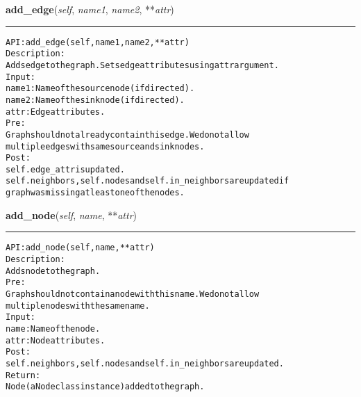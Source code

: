 \hspace{.8\funcindent}\begin{boxedminipage}{\funcwidth}

    \raggedright \textbf{add\_edge}(\textit{self}, \textit{name1}, \textit{name2}, **\textit{attr})

    \vspace{-1.5ex}

    \rule{\textwidth}{0.5\fboxrule}
\setlength{\parskip}{2ex}
\begin{alltt}

API: add\_edge(self, name1, name2, **attr)
Description:
Adds edge to the graph. Sets edge attributes using attr argument.
Input:
    name1: Name of the source node (if directed).
    name2: Name of the sink node (if directed).
    attr: Edge attributes.
Pre:
    Graph should not already contain this edge. We do not allow
    multiple edges with same source and sink nodes.
Post:
    self.edge\_attr is updated.
    self.neighbors, self.nodes and self.in\_neighbors are updated if
    graph was missing at least one of the nodes.
\end{alltt}

\setlength{\parskip}{1ex}
    \end{boxedminipage}

    \label{coinor:gimpy:graph:Graph:add_node}

    \vspace{0.5ex}

\hspace{.8\funcindent}\begin{boxedminipage}{\funcwidth}

    \raggedright \textbf{add\_node}(\textit{self}, \textit{name}, **\textit{attr})

    \vspace{-1.5ex}

    \rule{\textwidth}{0.5\fboxrule}
\setlength{\parskip}{2ex}
\begin{alltt}

API: add\_node(self, name, **attr)
Description:
Adds node to the graph.
Pre:
    Graph should not contain a node with this name. We do not allow
    multiple nodes with the same name.
Input:
    name: Name of the node.
    attr: Node attributes.
Post:
    self.neighbors, self.nodes and self.in\_neighbors are updated.
Return:
    Node (a Node class instance) added to the graph.
\end{alltt}

\setlength{\parskip}{1ex}
    \end{boxedminipage}

